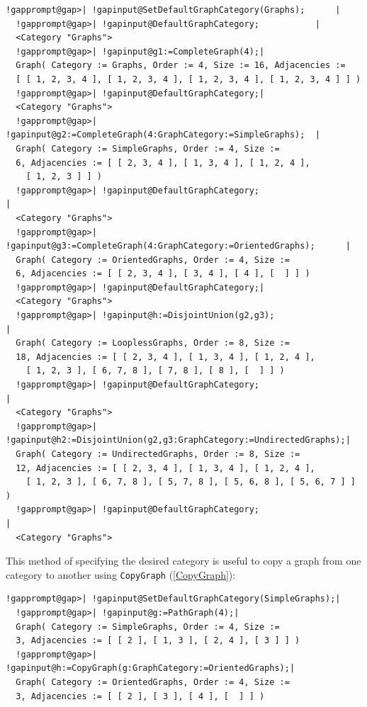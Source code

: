 \documentclass[a4paper,11pt]{report}
\begin{document}
{{ 
\begin{Verbatim}[commandchars=!@|,fontsize=\small,frame=single,label=Example]
  !gapprompt@gap>| !gapinput@SetDefaultGraphCategory(Graphs);      |
  !gapprompt@gap>| !gapinput@DefaultGraphCategory;           |
  <Category "Graphs">
  !gapprompt@gap>| !gapinput@g1:=CompleteGraph(4);|
  Graph( Category := Graphs, Order := 4, Size := 16, Adjacencies := 
  [ [ 1, 2, 3, 4 ], [ 1, 2, 3, 4 ], [ 1, 2, 3, 4 ], [ 1, 2, 3, 4 ] ] )
  !gapprompt@gap>| !gapinput@DefaultGraphCategory;|
  <Category "Graphs">
  !gapprompt@gap>| !gapinput@g2:=CompleteGraph(4:GraphCategory:=SimpleGraphs);  |
  Graph( Category := SimpleGraphs, Order := 4, Size := 
  6, Adjacencies := [ [ 2, 3, 4 ], [ 1, 3, 4 ], [ 1, 2, 4 ], 
    [ 1, 2, 3 ] ] )
  !gapprompt@gap>| !gapinput@DefaultGraphCategory;                            |
  <Category "Graphs">
  !gapprompt@gap>| !gapinput@g3:=CompleteGraph(4:GraphCategory:=OrientedGraphs);      |
  Graph( Category := OrientedGraphs, Order := 4, Size := 
  6, Adjacencies := [ [ 2, 3, 4 ], [ 3, 4 ], [ 4 ], [  ] ] )
  !gapprompt@gap>| !gapinput@DefaultGraphCategory;|
  <Category "Graphs">
  !gapprompt@gap>| !gapinput@h:=DisjointUnion(g2,g3);                                |
  Graph( Category := LooplessGraphs, Order := 8, Size := 
  18, Adjacencies := [ [ 2, 3, 4 ], [ 1, 3, 4 ], [ 1, 2, 4 ], 
    [ 1, 2, 3 ], [ 6, 7, 8 ], [ 7, 8 ], [ 8 ], [  ] ] )
  !gapprompt@gap>| !gapinput@DefaultGraphCategory;                                     |
  <Category "Graphs">
  !gapprompt@gap>| !gapinput@h2:=DisjointUnion(g2,g3:GraphCategory:=UndirectedGraphs);|
  Graph( Category := UndirectedGraphs, Order := 8, Size := 
  12, Adjacencies := [ [ 2, 3, 4 ], [ 1, 3, 4 ], [ 1, 2, 4 ], 
    [ 1, 2, 3 ], [ 6, 7, 8 ], [ 5, 7, 8 ], [ 5, 6, 8 ], [ 5, 6, 7 ] ] )
  !gapprompt@gap>| !gapinput@DefaultGraphCategory;                                    |
  <Category "Graphs">
\end{Verbatim}
 This method of specifying the desired category is useful to copy a graph from
one category to another using \texttt{CopyGraph} (\ref{CopyGraph}): 

 
\begin{Verbatim}[commandchars=!@|,fontsize=\small,frame=single,label=Example]
  !gapprompt@gap>| !gapinput@SetDefaultGraphCategory(SimpleGraphs);|
  !gapprompt@gap>| !gapinput@g:=PathGraph(4);|
  Graph( Category := SimpleGraphs, Order := 4, Size := 
  3, Adjacencies := [ [ 2 ], [ 1, 3 ], [ 2, 4 ], [ 3 ] ] )
  !gapprompt@gap>| !gapinput@h:=CopyGraph(g:GraphCategory:=OrientedGraphs);|
  Graph( Category := OrientedGraphs, Order := 4, Size := 
  3, Adjacencies := [ [ 2 ], [ 3 ], [ 4 ], [  ] ] )
\end{Verbatim}
 }

 }
\end{document}
